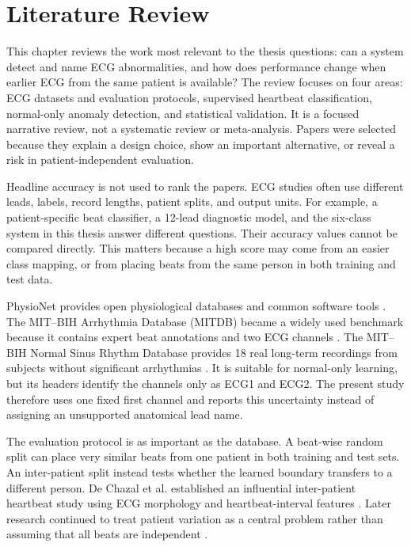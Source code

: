 \chapter{Literature Review}\label{ch:literature}

This chapter reviews the work most relevant to the thesis questions: can a
system detect and name ECG abnormalities, and how does performance change when
earlier ECG from the same patient is available? The review focuses on four
areas: ECG datasets and evaluation protocols, supervised heartbeat
classification, normal-only anomaly detection, and statistical validation. It
is a focused narrative review, not a systematic review or meta-analysis. Papers
were selected because they explain a design choice, show an important
alternative, or reveal a risk in patient-independent evaluation.

Headline accuracy is not used to rank the papers. ECG studies often use
different leads, labels, record lengths, patient splits, and output units. For
example, a patient-specific beat classifier, a 12-lead diagnostic model, and
the six-class system in this thesis answer different questions. Their accuracy
values cannot be compared directly. This matters because a high score may come
from an easier class mapping, or from placing beats from the same person in
both training and test data.

PhysioNet provides open physiological databases and common software tools
\cite{goldberger2000physionet}. The MIT--BIH Arrhythmia Database (MITDB) became
a widely used benchmark because it contains expert beat annotations and two ECG
channels \cite{moody2001impact,mitdb}. The MIT--BIH Normal Sinus Rhythm
Database provides 18 real long-term recordings from subjects without
significant arrhythmias \cite{nsrdb}. It is suitable for normal-only learning,
but its headers identify the channels only as ECG1 and ECG2. The present study
therefore uses one fixed first channel and reports this uncertainty instead of
assigning an unsupported anatomical lead name.

The evaluation protocol is as important as the database. A beat-wise random
split can place very similar beats from one patient in both training and test
sets. An inter-patient split instead tests whether the learned boundary transfers
to a different person. De Chazal et al. established an influential inter-patient
heartbeat study using ECG morphology and heartbeat-interval features
\cite{dechazal2004heartbeat}. Later research continued to treat patient variation
as a central problem rather than assuming that all beats are independent
\cite{mousavi2019seq2seq,zhang2021interpatient}.


